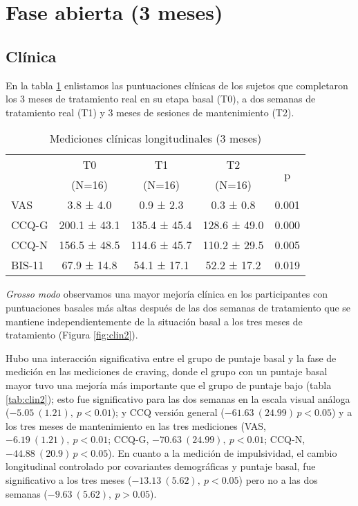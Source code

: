 \section{Fase abierta (3 meses)}
\subsection{Clínica}
En la tabla \ref{tab:cl2} enlistamos las puntuaciones clínicas de los sujetos que completaron los 3 meses de tratamiento real en su etapa basal (T0), a dos semanas de tratamiento real (T1) y 3 meses de sesiones de mantenimiento (T2).

\begin{table}[!htb]
    \centering
    \small
    \caption{Mediciones clínicas longitudinales (3 meses)}
    \label{tab:cl2}
\begin{tabular}{lcccc}
\hline
 & T0 & T1 & T2 & \multirow{2}{*}{p}\\
 & (N=16) & (N=16) & (N=16) &  \\
\hline
VAS   &  3.8 ±  4.0 &  0.9 ±  2.3 &  0.3 ±  0.8 & 0.001\\
CCQ-G  & 200.1 ± 43.1 & 135.4 ± 45.4 & 128.6 ± 49.0 & 0.000\\
CCQ-N  & 156.5 ± 48.5 & 114.6 ± 45.7 & 110.2 ± 29.5 & 0.005\\
BIS-11 & 67.9 ± 14.8 & 54.1 ± 17.1 & 52.2 ± 17.2 & 0.019\\
\hline
\end{tabular}
\end{table}

\textit{Grosso modo} observamos una mayor mejoría clínica en los participantes con puntuaciones basales más altas después de las dos semanas de tratamiento que se mantiene independientemente de la situación basal a los tres meses de tratamiento (Figura \ref{fig:clin2}).\par
Hubo una interacción significativa entre el grupo de puntaje basal y la fase de medición en las mediciones de craving, donde el grupo con un puntaje basal mayor tuvo una mejoría más importante que el grupo de puntaje bajo (tabla \ref{tab:clin2}); esto fue significativo para las dos semanas en la escala visual análoga ($-5.05\ (1.21),\ p<0.01$); y CCQ versión general ($-61.63\ (24.99)\, p<0.05$) y a los tres meses de mantenimiento en las tres mediciones (VAS, $-6.19\ (1.21),\ p<0.01$; CCQ-G, $-70.63\ (24.99),\ p<0.01$; CCQ-N, $-44.88\ (20.9)\, p<0.05$). En cuanto a la medición de impulsividad, el cambio longitudinal controlado por covariantes demográficas y puntaje basal, fue significativo a los tres meses ($-13.13\ (5.62),\ p<0.05$) pero no a las dos semanas ($-9.63\ (5.62),\ p>0.05$).


